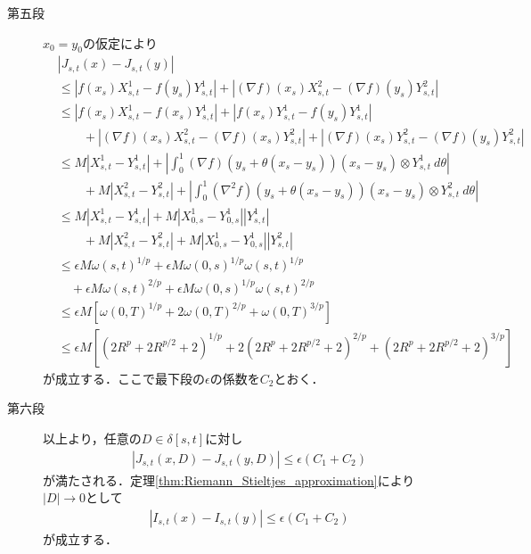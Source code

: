\begin{prf}
\begin{description}
			\item[第五段]
				$x_0 = y_0$の仮定により
				\begin{align}
					&\left| J_{s,t}(x) - J_{s,t}(y) \right| \\
					&\leq \left| f(x_s)X^1_{s,t} - f(y_s)Y^1_{s,t} \right| + \left| (\nabla f)(x_s)X^2_{s,t} - (\nabla f)(y_s)Y^2_{s,t} \right| \\
					&\leq \left| f(x_s)X^1_{s,t} - f(x_s)Y^1_{s,t} \right|
						+ \left| f(x_s)Y^1_{s,t} - f(y_s)Y^1_{s,t} \right| \\
						&\qquad + \left| (\nabla f)(x_s)X^2_{s,t} - (\nabla f)(x_s)Y^2_{s,t} \right|
						+ \left| (\nabla f)(x_s)Y^2_{s,t} - (\nabla f)(y_s)Y^2_{s,t} \right| \\
					&\leq M \left| X^1_{s,t} - Y^1_{s,t} \right|
						+ \left| \int_0^1 (\nabla f)(y_s + \theta(x_s - y_s))(x_s - y_s) \otimes Y^1_{s,t}\ d\theta \right| \\
						&\qquad + M \left| X^2_{s,t} - Y^2_{s,t} \right|
						+ \left| \int_0^1 (\nabla^2 f)(y_s + \theta(x_s - y_s))(x_s - y_s) \otimes Y^2_{s,t}\ d\theta \right| \\
					&\leq M \left| X^1_{s,t} - Y^1_{s,t} \right|
						+ M \left| X^1_{0,s} - Y^1_{0,s}\right| \left| Y^1_{s,t} \right| \\
						&\qquad + M \left| X^2_{s,t} - Y^2_{s,t} \right| 
						+ M \left| X^1_{0,s} - Y^1_{0,s}\right| \left| Y^2_{s,t} \right| \\
					&\leq \epsilon M \omega(s,t)^{1/p} + \epsilon M \omega(0,s)^{1/p} \omega(s,t)^{1/p} \\
						&\quad + \epsilon M \omega(s,t)^{2/p} + \epsilon M \omega(0,s)^{1/p} \omega(s,t)^{2/p} \\
					&\leq \epsilon M \left[ \omega(0,T)^{1/p} + 2\omega(0,T)^{2/p} + \omega(0,T)^{3/p} \right] \\
					&\leq \epsilon M \left[ \left( 2 R^p + 2R^{p/2} + 2 \right)^{1/p}
						+ 2\left( 2 R^p + 2R^{p/2} + 2 \right)^{2/p}
						+\left( 2 R^p + 2R^{p/2} + 2 \right)^{3/p} \right]
				\end{align}
				が成立する．ここで最下段の$\epsilon$の係数を$C_2$とおく．
				
			\item[第六段]
				以上より，任意の$D \in \delta[s,t]$に対し
				\begin{align}
					\left| J_{s,t}(x,D) - J_{s,t}(y,D) \right|
					\leq \epsilon (C_1 + C_2)
				\end{align}
				が満たされる．定理\ref{thm:Riemann_Stieltjes_approximation}により
				$|D| \longrightarrow 0$として
				\begin{align}
					\left| I_{s,t}(x) - I_{s,t}(y) \right|
					\leq \epsilon (C_1 + C_2)
				\end{align}
				が成立する．
				\QED
		\end{description}
	\end{prf}
	
